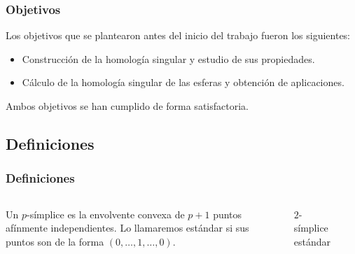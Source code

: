 \documentclass{beamer}
\begin{document}

\begin{frame}
  \frametitle{Objetivos}
  Los objetivos que se plantearon antes del inicio del trabajo fueron los siguientes:
  \begin{itemize}
    \item Construcción de la homología singular y estudio de sus propiedades.
    \item Cálculo de la homología singular de las esferas y obtención de aplicaciones.
  \end{itemize}
  Ambos objetivos se han cumplido de forma satisfactoria.
\end{frame}


\subsection{Definiciones}

\begin{frame}
  \frametitle{Definiciones}
  \begin{columns}[c]

    Un $p$-símplice es la envolvente convexa de $p+1$ puntos afínmente independientes.
    Lo llamaremos estándar si sus puntos son de la forma $(0, \dots, 1, \dots, 0)$.

    \begin{figure}
      \caption{$2$-símplice estándar}
    \end{figure}

  \end{columns}

\end{frame}
\end{document}
